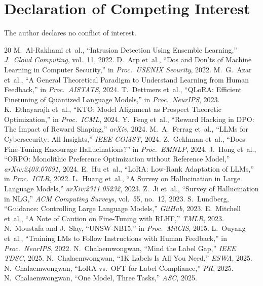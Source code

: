\documentclass[journal]{IEEEtran}
\begin{document}
\section*{Declaration of Competing Interest}
The author declares no conflict of interest.

\begin{thebibliography}{20}
 M.~Al-Rakhami et~al., ``Intrusion Detection Using Ensemble Learning,'' \emph{J.\ Cloud Computing}, vol.~11, 2022.
 D.~Arp et~al., ``Dos and Don'ts of Machine Learning in Computer Security,'' in \emph{Proc.\ USENIX Security}, 2022.
 M.~G.~Azar et~al., ``A General Theoretical Paradigm to Understand Learning from Human Feedback,'' in \emph{Proc.\ AISTATS}, 2024.
 T.~Dettmers et~al., ``QLoRA: Efficient Finetuning of Quantized Language Models,'' in \emph{Proc.\ NeurIPS}, 2023.
 K.~Ethayarajh et~al., ``KTO: Model Alignment as Prospect Theoretic Optimization,'' in \emph{Proc.\ ICML}, 2024.
 Y.~Feng et~al., ``Reward Hacking in DPO: The Impact of Reward Shaping,'' \emph{arXiv}, 2024.
 M.~A.~Ferrag et~al., ``LLMs for Cybersecurity: All Insights,'' \emph{IEEE COMST}, 2024.
 Z.~Gekhman et~al., ``Does Fine-Tuning Encourage Hallucinations?'' in \emph{Proc.\ EMNLP}, 2024.
 J.~Hong et~al., ``ORPO: Monolithic Preference Optimization without Reference Model,'' \emph{arXiv:2403.07691}, 2024.
 E.~Hu et~al., ``LoRA: Low-Rank Adaptation of LLMs,'' in \emph{Proc.\ ICLR}, 2022.
 L.~Huang et~al., ``A Survey on Hallucination in Large Language Models,'' \emph{arXiv:2311.05232}, 2023.
 Z.~Ji et~al., ``Survey of Hallucination in NLG,'' \emph{ACM Computing Surveys}, vol.~55, no.~12, 2023.
 S.~Lundberg, ``Guidance: Controlling Large Language Models,'' \emph{GitHub}, 2023.
 E.~Mitchell et~al., ``A Note of Caution on Fine-Tuning with RLHF,'' \emph{TMLR}, 2023.
 N.~Moustafa and J.~Slay, ``UNSW-NB15,'' in \emph{Proc.\ MilCIS}, 2015.
 L.~Ouyang et~al., ``Training LMs to Follow Instructions with Human Feedback,'' in \emph{Proc.\ NeurIPS}, 2022.
 N.~Chalaemwongwan, ``Mind the Label Gap,'' \emph{IEEE TDSC}, 2025.
 N.~Chalaemwongwan, ``1K Labels Is All You Need,'' \emph{ESWA}, 2025.
 N.~Chalaemwongwan, ``LoRA vs.\ OFT for Label Compliance,'' \emph{PR}, 2025.
 N.~Chalaemwongwan, ``One Model, Three Tasks,'' \emph{ASC}, 2025.

\end{thebibliography}
\end{document}
